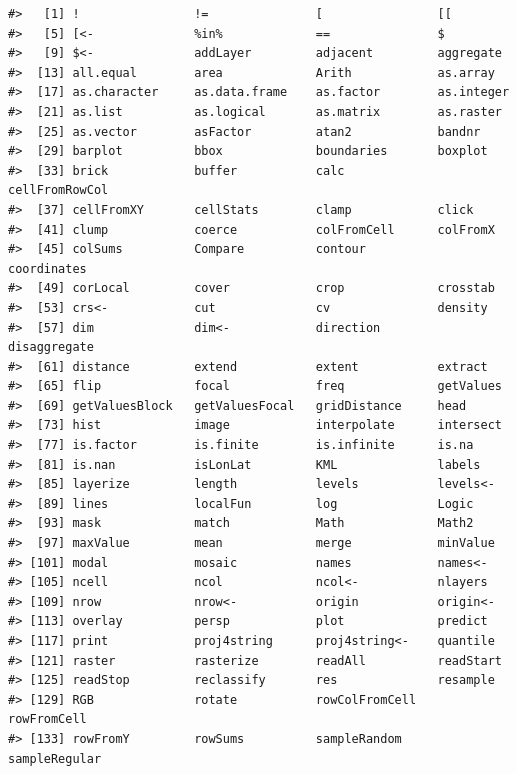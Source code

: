 \documentclass[]{book}
\begin{document}
\begin{verbatim}
#>   [1] !                !=               [                [[              
#>   [5] [<-              %in%             ==               $               
#>   [9] $<-              addLayer         adjacent         aggregate       
#>  [13] all.equal        area             Arith            as.array        
#>  [17] as.character     as.data.frame    as.factor        as.integer      
#>  [21] as.list          as.logical       as.matrix        as.raster       
#>  [25] as.vector        asFactor         atan2            bandnr          
#>  [29] barplot          bbox             boundaries       boxplot         
#>  [33] brick            buffer           calc             cellFromRowCol  
#>  [37] cellFromXY       cellStats        clamp            click           
#>  [41] clump            coerce           colFromCell      colFromX        
#>  [45] colSums          Compare          contour          coordinates     
#>  [49] corLocal         cover            crop             crosstab        
#>  [53] crs<-            cut              cv               density         
#>  [57] dim              dim<-            direction        disaggregate    
#>  [61] distance         extend           extent           extract         
#>  [65] flip             focal            freq             getValues       
#>  [69] getValuesBlock   getValuesFocal   gridDistance     head            
#>  [73] hist             image            interpolate      intersect       
#>  [77] is.factor        is.finite        is.infinite      is.na           
#>  [81] is.nan           isLonLat         KML              labels          
#>  [85] layerize         length           levels           levels<-        
#>  [89] lines            localFun         log              Logic           
#>  [93] mask             match            Math             Math2           
#>  [97] maxValue         mean             merge            minValue        
#> [101] modal            mosaic           names            names<-         
#> [105] ncell            ncol             ncol<-           nlayers         
#> [109] nrow             nrow<-           origin           origin<-        
#> [113] overlay          persp            plot             predict         
#> [117] print            proj4string      proj4string<-    quantile        
#> [121] raster           rasterize        readAll          readStart       
#> [125] readStop         reclassify       res              resample        
#> [129] RGB              rotate           rowColFromCell   rowFromCell     
#> [133] rowFromY         rowSums          sampleRandom     sampleRegular   

\end{verbatim}
\end{document}

